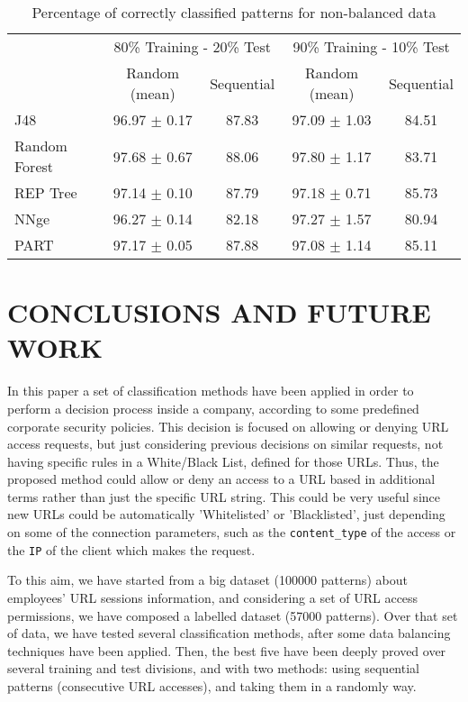\documentclass{llncs}
\begin{document}
\begin{table*}[htpb]
\centering
 \caption{\label{tab_featselect} Percentage of correctly classified patterns for non-balanced data}
{\small
\begin{tabular}{|l|c|c|c|c|}
\cline{2-5}
\multicolumn{1}{l|}{} & \multicolumn{2}{c|}{80\% Training - 20\% Test} & \multicolumn{2}{c|}{90\% Training - 10\% Test} \\ 
\cline{2-5}
\multicolumn{1}{l|}{} & Random (mean) & Sequential & Random (mean) & Sequential \\ 
\hline
J48 & 96.97 $\pm$ 0.17 & 87.83 & 97.09 $\pm$ 1.03 & 84.51 \\ 
\cline{1-1}
Random Forest & 97.68 $\pm$ 0.67 & 88.06 & 97.80 $\pm$ 1.17 & 83.71 \\ 
\cline{1-1}
REP Tree & 97.14 $\pm$ 0.10 & 87.79 & 97.18 $\pm$ 0.71 & 85.73 \\ 
\cline{1-1}
NNge & 96.27 $\pm$ 0.14 & 82.18 & 97.27 $\pm$ 1.57 & 80.94 \\ 
\cline{1-1}
PART & 97.17 $\pm$ 0.05 & 87.88 & 97.08 $\pm$ 1.14 & 85.11 \\ 
\hline
\end{tabular}
}
\end{table*}


%
\section{\uppercase{Conclusions and Future Work}}
\label{sec:conclusions}

\noindent In this paper a set of classification methods have been applied
in order to perform a decision process inside a company, according to
some predefined corporate security policies. 
This decision is focused on allowing or denying URL access requests, but just considering previous decisions on similar requests, not having specific rules in a White/Black List, defined for those URLs. Thus, the proposed method could allow or deny an access to a URL based in additional terms rather than just the specific URL string. This could be very useful since new URLs could be automatically 'Whitelisted' or 'Blacklisted', just depending on some of the connection parameters, such as the \texttt{content\_type} of the access or the \texttt{IP} of the client which makes the request.

To this aim, we have started from a big dataset (100000 patterns) about employees' URL sessions information, and considering a set of URL access permissions, we have composed a labelled dataset (57000 patterns). Over that set of data, we have tested several classification methods, after some data balancing techniques have been applied. Then, the best five have been deeply proved over several training and test divisions, and with two methods: using sequential patterns (consecutive URL accesses), and taking them in a randomly way.
\end{document}
